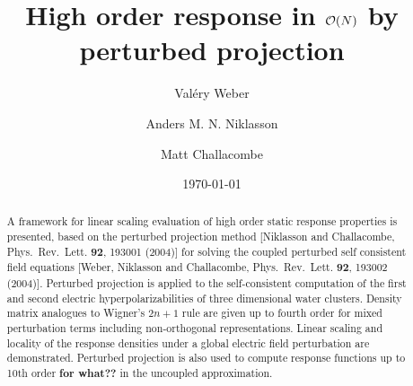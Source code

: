 \documentclass[prl,aps,letterpaper,twocolumn,showpacs,twocolumngrid,superbib]{revtex4}
\begin{document}
\title{High order response in ${\cal O}(N)$ by perturbed projection} 

\author{Val\'ery Weber}
%
\author{Anders M. N. Niklasson}%
\author{Matt Challacombe}%

%

\date{\today}

\begin{abstract}
A framework for linear scaling evaluation of high order static response properties is 
presented, based on the perturbed projection method [Niklasson and Challacombe, 
Phys.\ Rev.\ Lett. {\bf 92}, 193001 (2004)]  for solving the coupled perturbed 
self consistent field equations [Weber, Niklasson and  Challacombe, 
Phys.\ Rev.\ Lett. {\bf 92}, 193002 (2004)].  Perturbed projection is applied to 
the self-consistent computation of the first and second electric hyperpolarizabilities 
of three dimensional water clusters.  Density matrix analogues to Wigner's $2n+1$ rule 
are given up to fourth order for mixed perturbation terms including non-orthogonal 
representations. Linear scaling and locality of the response densities under a global 
electric field perturbation are demonstrated.  Perturbed projection is also used to compute 
response functions up to 10th order {\bf for what??} in the uncoupled approximation.  
\end{abstract}

\maketitle

\end{document}
